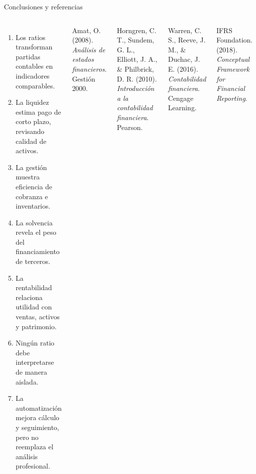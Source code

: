 \begin{frame}{Conclusiones y referencias}
\scriptsize
\begin{columns}[T,totalwidth=\textwidth]
\begin{enumerate}
  \item Los ratios transforman partidas contables en indicadores comparables.
  \item La liquidez estima pago de corto plazo, revisando calidad de activos.
  \item La gestión muestra eficiencia de cobranza e inventarios.
  \item La solvencia revela el peso del financiamiento de terceros.
  \item La rentabilidad relaciona utilidad con ventas, activos y patrimonio.
  \item Ningún ratio debe interpretarse de manera aislada.
  \item La automatización mejora cálculo y seguimiento, pero no reemplaza el análisis profesional.
\end{enumerate}


Amat, O. (2008). \textit{Análisis de estados financieros}. Gestión 2000.

Horngren, C. T., Sundem, G. L., Elliott, J. A., \& Philbrick, D. R. (2010). \textit{Introducción a la contabilidad financiera}. Pearson.

Warren, C. S., Reeve, J. M., \& Duchac, J. E. (2016). \textit{Contabilidad financiera}. Cengage Learning.

IFRS Foundation. (2018). \textit{Conceptual Framework for Financial Reporting}.
\end{columns}
\end{frame}
